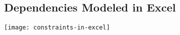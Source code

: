 
\subsection{Dependencies Modeled in Excel}
\begin{frame}{\insertsubsection}
	\vspace{-7mm}\texttt{[image: constraints-in-excel]}
\end{frame}